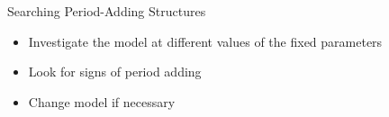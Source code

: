 %
%
%

\begin{frame}{Searching Period-Adding Structures}
    \begin{itemize}
        \item Investigate the model at different values of the fixed parameters
        \item Look for signs of period adding
        \item Change model if necessary
    \end{itemize}
\end{frame}